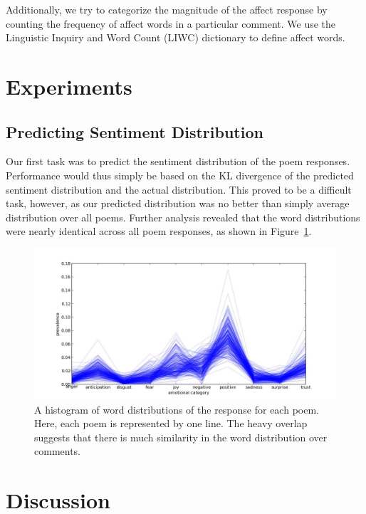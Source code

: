 \documentclass[11pt]{article}
\begin{document}
Additionally, we try to categorize the magnitude of the affect response by counting the frequency of affect words in a particular comment. We use the Linguistic Inquiry and Word Count (LIWC) dictionary to define affect words.

\section{Experiments}

\subsection{Predicting Sentiment Distribution}
Our first task was to predict the sentiment distribution of the poem responses. Performance would thus simply be based on the KL divergence of the predicted sentiment distribution and the actual distribution. This proved to be a difficult task, however, as our predicted distribution was no better than simply average distribution over all poems. Further analysis revealed that the word distributions were nearly identical across all poem responses, as shown in Figure~\ref{histogram}.

\begin{figure}[ht]
\begin{center}
\includegraphics[scale=0.4]{../experiments/exp10.jpg}
\end{center}
\caption{A histogram of word distributions of the response for each poem. Here, each poem is represented by one line. The heavy overlap suggests that there is much similarity in the word distribution over comments.}
\label{histogram}
\end{figure}

\section{Discussion}
\end{document}
